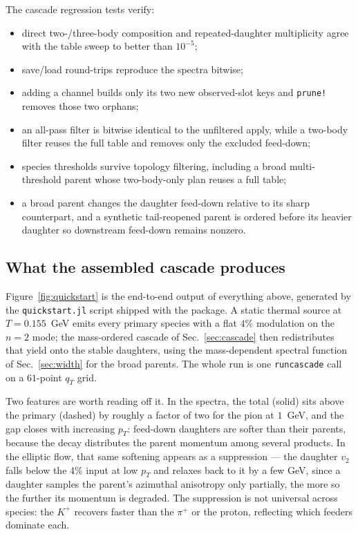 \documentclass[11pt]{article}
\begin{document}
The cascade regression tests verify:
\begin{itemize}
\item direct two-/three-body composition and repeated-daughter multiplicity
agree with the table sweep to better than $10^{-5}$;
\item save/load round-trips reproduce the spectra bitwise;
\item adding a channel builds only its two new observed-slot keys and
\texttt{prune!} removes those two orphans;
\item an all-pass filter is bitwise identical to the unfiltered apply, while a
two-body filter reuses the full table and removes only the excluded feed-down;
\item species thresholds survive topology filtering, including a broad
multi-threshold parent whose two-body-only plan reuses a full table;
\item a broad parent changes the daughter feed-down relative to its sharp
counterpart, and a synthetic tail-reopened parent is ordered before its
heavier daughter so downstream feed-down remains nonzero.
\end{itemize}

\subsection{What the assembled cascade produces}
\label{sec:quickstart-figure}

Figure~\ref{fig:quickstart} is the end-to-end output of everything above,
generated by the \texttt{quickstart.jl} script shipped with the package.  A
static thermal source at $T=0.155$~GeV emits every primary species with a flat
$4\%$ modulation on the $n=2$ mode; the mass-ordered cascade of
Sec.~\ref{sec:cascade} then redistributes that yield onto the stable
daughters, using the mass-dependent spectral function of
Sec.~\ref{sec:width} for the broad parents.  The whole run is one
\texttt{runcascade} call on a $61$-point $q_T$ grid.

Two features are worth reading off it.  In the spectra, the total (solid) sits
above the primary (dashed) by roughly a factor of two for the pion at
$1$~GeV, and the gap closes with increasing $p_T$: feed-down daughters are
softer than their parents, because the decay distributes the parent momentum
among several products.  In the elliptic flow, that same softening appears as
a suppression --- the daughter $v_2$ falls below the $4\%$ input at low $p_T$
and relaxes back to it by a few GeV, since a daughter samples the parent's
azimuthal anisotropy only partially, the more so the further its momentum is
degraded.  The suppression is not universal across species: the $K^+$ recovers
faster than the $\pi^+$ or the proton, reflecting which feeders dominate each.
\end{document}
